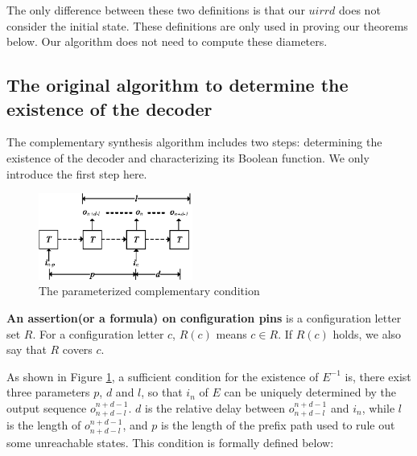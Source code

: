 \documentclass{acm_proc_article-sp}
\begin{document}
The only difference between these two definitions is that
our $uirrd$ does not consider the initial state.
These definitions are only used in proving our theorems below.
Our algorithm does not need to compute these diameters.


\subsection{The original algorithm to determine the existence of the decoder}\label{subsec_chkextdec}


The complementary synthesis algorithm\cite{ShengYuShen:iccad09} includes two steps:
determining the existence of the decoder and characterizing its Boolean function.
We only introduce the first step here.


\begin{figure}[b]
\begin{center}
\includegraphics[width=0.45\textwidth]{t1}
\end{center}
\caption{The parameterized complementary condition}
  \label{t1}
\end{figure}

\begin{definition11}\label{def_ass}
\textbf{An assertion(or a formula) on configuration pins} is a configuration letter set $R$.
For a configuration letter $c$,
$R(c)$ means $c\in R$.
If $R(c)$ holds,
we also say that $R$ covers $c$.
\end{definition11}


As shown in Figure \ref{t1},
a sufficient condition for the existence of $E^{-1}$ is,
there exist three parameters $p$, $d$ and $l$,
so that $i_n$ of $E$ can be uniquely determined by the output sequence $o_{n+d-l}^{n+d-1}$.
$d$ is the relative delay between $o_{n+d-l}^{n+d-1}$ and $i_n$,
while $l$ is the length of $o_{n+d-l}^{n+d-1}$,
and $p$ is the length of the prefix path used to rule out some unreachable states.
This condition is formally defined below:
\end{document}
